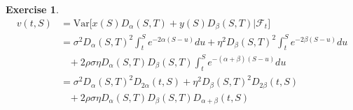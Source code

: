 \documentclass[11pt,a4paper]{jsarticle}
\newtheorem{exercise}{Exercise}[section]
\begin{document}
\hrulefill
\begin{exercise}
\begin{align}
v(t, S)
& =
\mathrm{Var} \bigl[ x(S) D_\alpha (S, T) + y(S) D_\beta (S, T) | \mathcal{F}_t \bigr] \nonumber \\
& =
\sigma^2 D_\alpha (S, T)^2 \int_t^S e^{-2\alpha (S - u)} du
+ \eta^2 D_\beta (S, T)^2 \int_t^S e^{-2\beta (S - u)} du \nonumber \\
& \hspace{10pt}
+ 2 \rho \sigma \eta D_\alpha (S, T) D_\beta (S, T) \int_t^S e^{-(\alpha + \beta) (S - u)} du \nonumber \\
& =
\sigma^2 D_\alpha (S, T)^2 D_{2\alpha} (t, S)
+ \eta^2 D_\beta (S, T)^2 D_{2\beta} (t, S) \nonumber \\
& \hspace{10pt}
+ 2 \rho \sigma \eta D_\alpha (S, T) D_\beta (S, T) D_{\alpha + \beta} (t, S) \nonumber
\end{align}
\end{exercise}
\hrulefill \\
\end{document}
